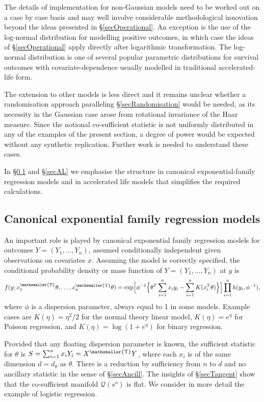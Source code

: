 \documentclass[10pt, reqno]{amsart}
\numberwithin{equation}{section}
\newcommand{\cosuff}{\mathcal{Q}}
\newcommand{\T}{{\mathsmaller {\rm T}}}
\begin{document}
The details of implementation for non-Gaussian models need to be worked out on a case by case basis and may well involve considerable methodological innovation beyond the ideas presented in \S \ref{secOperational}. An exception is the use of the log-normal distribution for modelling positive outcomes, in which case the ideas of \S \ref{secOperational} apply directly after logarithmic transformation. The log-normal distribution is one of several popular parametric distributions for survival outcomes with covariate-dependence usually modelled in traditional accelerated-life form. 

The extension to other models is less direct and it remains unclear whether a randomisation approach paralleling \S \ref{secRandomisation} would be needed, as its necessity in the Gaussian case arose from rotational invariance of the Haar measure. Since the notional co-sufficient statistic is not uniformly distributed in any of the examples of the present section, a degree of power would be expected without any synthetic replication. Further work is needed to understand these cases.

In \S \ref{secExpFam} and \S \ref{secAL} we emphasise the structure in canonical exponential-family regression models and in accelerated life models that simplifies the required calculations. 

\subsection{Canonical exponential family regression models}\label{secExpFam}

An important role is played by canonical exponential family regression models for outcomes $Y=(Y_{1},\ldots,Y_n)$, assumed conditionally independent given observations on covariates $x$. 
Assuming the model is correctly specified, the conditional probability density or mass function of $Y=(Y_{1},\ldots,Y_n)$ at $y$ is
\[
f(y;x_{1}^\T\theta, \ldots, x_n^\T\theta)=\exp\Bigl[\phi^{-1}\Bigl\{\theta^{T}\sum_{i=1}^{n}x_i y_i - \sum_{i=1}^n K(x_i^{T}\theta)\Bigr\}\Bigr]\prod_{i=1}^n h(y_i, \phi^{-1}),
\]
where $\phi$ is a dispersion parameter, always equal to 1 in some models. Example cases are $K(\eta)=\eta^2/2$ for the normal theory linear model, $K(\eta)=e^\eta$ for Poisson regression, and $K(\eta)=\log(1+e^\eta)$ for binary regression.

Provided that any floating dispersion parameter is known, the sufficient statistic for $\theta$ is $S = \sum_{i=1}^n x_i Y_i = X^\T Y$, where each $x_i$ is of the same dimension $d=d_{\theta}$ as $\theta$. There is a reduction by sufficiency from $n$ to $d$ and no ancillary statistic in the sense of \S \ref{secAncill}. The insights of \S \ref{secTangent} show that the co-sufficient manifold $\cosuff(s^o)$ is flat. We consider in more detail the example of logistic regression.
\end{document}
